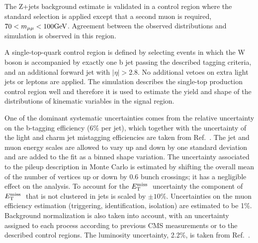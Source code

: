 The Z+jets background estimate is validated in a control region where the standard selection 
is applied except that a second muon is required,  $ 70 < m_{\mu\mu} < 100\mathrm{GeV}$. Agreement
between the observed distributions and simulation is observed in this region.

A single-top-quark control region is defined by selecting events in which the
W boson is accompanied by exactly one b jet
passing the described tagging criteria, and an additional forward jet with $|\eta|>$2.8.
No additional vetoes on extra light jets or leptons are applied.
The simulation describes the single-top production control region
well and therefore
it is used to estimate the yield and shape of the distributions of kinematic variables in the signal region.

One of the dominant systematic uncertainties comes from the 
relative uncertainty on the b-tagging efficiency ($6\%$ per jet), which together with the uncertainty of the light and charm 
jet mistagging efficiencies are taken from Ref.~\cite{BTAGNOTE}.
The jet and muon energy scales are allowed to vary up and down by one standard deviation and
are added to the fit as a binned shape variation.
The uncertainty associated to the pileup description in Monte Carlo is estimated by shifting the overall mean of 
the number of vertices up or down by 0.6 bunch crossings; it has a negligible effect on the analysis.
To account for the $E_\mathrm{T}^{\mathrm{miss}}\;$ uncertainty the component of $E_\mathrm{T}^{\mathrm{miss}}\;$ that is not clustered in jets is scaled by $\pm10\%$.
Uncertainties on the muon efficiency estimation (triggering, identification, isolation) are estimated to be 1\%.
Background normalization is also taken into account, with an uncertainty assigned to each process
according to previous CMS measurements or to the described control regions. 
The luminosity uncertainty, 2.2\%, 
is taken from Ref.~\cite{CMS-PAS-SMP-12-008}.

